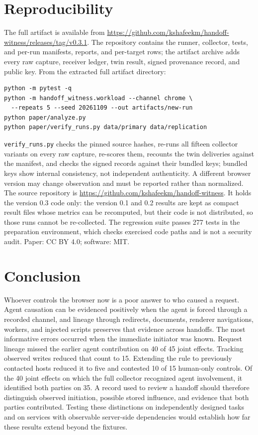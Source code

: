 \documentclass[11pt]{article}
\theoremstyle{definition}
\begin{document}
\section{Reproducibility}
The full artifact is available from \url{https://github.com/kshafeekm/handoff-witness/releases/tag/v0.3.1}. The repository contains the runner, collector, tests, and per-run manifests,
reports, and per-target rows; the artifact archive adds every raw capture,
receiver ledger, twin result, signed provenance record, and public key. From the extracted full artifact directory:
\begin{verbatim}
python -m pytest -q
python -m handoff_witness.workload --channel chrome \
  --repeats 5 --seed 20261109 --out artifacts/new-run
python paper/analyze.py
python paper/verify_runs.py data/primary data/replication
\end{verbatim}
\texttt{verify\_runs.py} checks the pinned source hashes, re-runs all fifteen
collector variants on every raw capture, re-scores them, recounts the twin
deliveries against the manifest, and checks the signed records against their
bundled keys; bundled keys show internal consistency, not independent
authenticity. A different browser version may change observation and must be
reported rather than normalized. The source repository is
\url{https://github.com/kshafeekm/handoff-witness}. It holds the version 0.3 code
only: the version 0.1 and 0.2 results are kept as compact result files whose
metrics can be recomputed, but their code is not distributed, so those runs
cannot be re-collected. The
regression suite passes 277 tests in the preparation environment, which checks
exercised code paths and is not a security audit. Paper: CC BY 4.0; software:
MIT.

\section{Conclusion}
Whoever controls the browser now is a poor answer to who caused a request. Agent
causation can be evidenced positively when the agent is forced through a
recorded channel, and lineage through redirects, documents, renderer
navigations, workers, and injected scripts preserves that evidence across
handoffs. The most informative errors occurred when the immediate initiator was known.
Request lineage missed the earlier agent contribution on 40 of 45 joint effects.
Tracking observed writes reduced that count to 15. Extending the rule to previously
contacted hosts reduced it to five and contested 10 of 15 human-only controls. Of the 40
joint effects on which the full collector recognized agent involvement, it identified
both parties on 35. A record used to review a handoff should therefore distinguish
observed initiation, possible stored influence, and evidence that both parties
contributed. Testing these distinctions on independently designed tasks and on services
with observable server-side dependencies would establish how far these results extend
beyond the fixtures.
\end{document}
